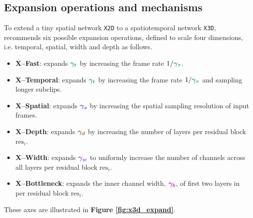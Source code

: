 \subsection{Expansion operations and mechanisms}
\label{sec:expand_dim_and_method}

To extend a tiny spatial network \texttt{X2D} to a spatiotemporal network \texttt{X3D}, \cite{feichtenhofer2020x3d} recommends six possible expansion operations, defined to scale four dimensions, i.e. temporal, spatial, width and depth as follows.

\begin{itemize}
    \item \textbf{X–Fast}: expands $\xgt$ by increasing the frame rate $1 / \xgtau$.
    \item \textbf{X–Temporal}: expands $\xgt$ by increasing the frame rate $1 / \xgtau$ and sampling longer subclips.
    \item \textbf{X–Spatial}: expands $\xgs$ by increasing the spatial sampling resolution of input frames.
    \item \textbf{X–Depth}: expands $\xgd$ by increasing the number of layers per residual block $\text{res}_i$.
    \item \textbf{X–Width}: expands $\xgw$ to uniformly increase the number of channels across all layers per residual block $\text{res}_i$.
    \item \textbf{X–Bottleneck}: expands the inner channel width, $\xgb$, of first two layers in per residual block $\text{res}_i$.
\end{itemize}

These axes are illustrated in \textbf{Figure \ref{fig:x3d_expand}}.

